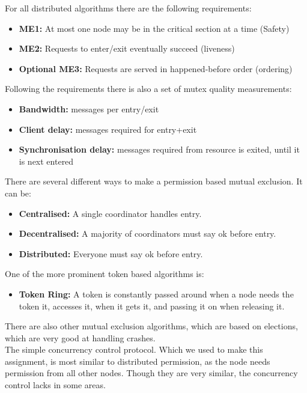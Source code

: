 For all distributed algorithms there are the following requirements:
\begin{itemize}
\item \textbf{ME1:} At most one node may be in the critical section at a time (Safety)
\item \textbf{ME2:} Requests to enter/exit eventually succeed 
(liveness)
\item \textbf{Optional ME3:} Requests are served in happened-before 
order (ordering)
\end{itemize} 

Following the requirements there is also a set of mutex quality measurements:
\begin{itemize}
\item \textbf{Bandwidth:} messages per entry/exit
\item \textbf{Client delay:} messages required for entry+exit
\item \textbf{Synchronisation delay:} messages required from resource is exited, until it is next entered
\end{itemize}

There are several different ways to make a permission based mutual exclusion. It can be:
\begin{itemize}
\item \textbf{Centralised:} A single coordinator handles entry.
\item \textbf{Decentralised:} A majority of coordinators must say ok before entry.
\item \textbf{Distributed:} Everyone must say ok before entry. 
\end{itemize}  

One of the more prominent token based algorithms is:
\begin{itemize}
\item \textbf{Token Ring:} A token is constantly passed around when a node needs the token it, accesses it, when it gets it, and passing it on when releasing it. 
\end{itemize} 

There are also other mutual exclusion algorithms, which are based on elections, which are very good at handling crashes. \\

The simple concurrency control protocol. Which we used to make this assignment, is most similar to distributed permission, as the node needs permission from all other nodes. Though they are very similar, the concurrency control lacks in some areas. \\

